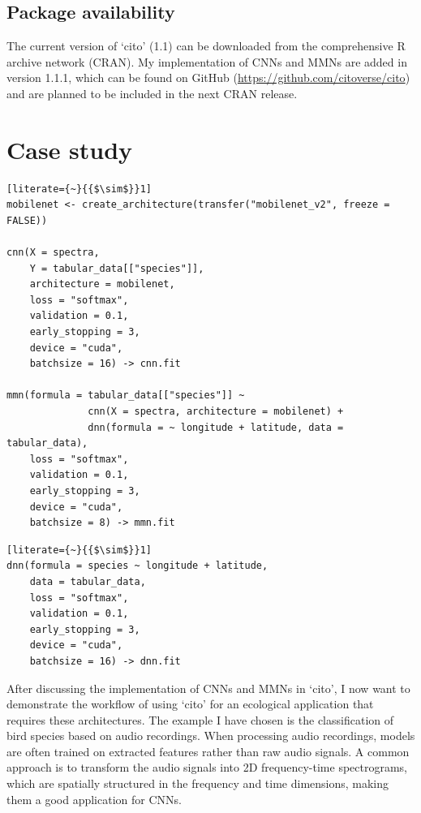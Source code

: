 \documentclass[12pt,twoside]{scrreport}
\newcommand{\pkg}[1]{`#1'}
\begin{document}
\section*{Package availability}
The current version of \pkg{cito} (1.1) can be downloaded from the comprehensive R archive network (CRAN). My implementation of CNNs and MMNs are added in version 1.1.1, which can be found on GitHub (\url{https://github.com/citoverse/cito}) and are planned to be included in the next CRAN release.

\chapter*{Case study}
\newsavebox{\cnn} %
\begin{lrbox}{\cnn}
	\begin{lstlisting}[literate={~}{{$\sim$}}1]
mobilenet <- create_architecture(transfer("mobilenet_v2", freeze = FALSE))

cnn(X = spectra,
    Y = tabular_data[["species"]],
    architecture = mobilenet,
    loss = "softmax",
    validation = 0.1,
    early_stopping = 3,
    device = "cuda",
    batchsize = 16) -> cnn.fit
		
mmn(formula = tabular_data[["species"]] ~ 
              cnn(X = spectra, architecture = mobilenet) +
              dnn(formula = ~ longitude + latitude, data = tabular_data),
    loss = "softmax",
    validation = 0.1,
    early_stopping = 3,
    device = "cuda",
    batchsize = 8) -> mmn.fit
	\end{lstlisting}
\end{lrbox}

\newsavebox{\dnn} %
\begin{lrbox}{\dnn}
	\begin{minipage}{\wd\cnn}
		\begin{lstlisting}[literate={~}{{$\sim$}}1]
dnn(formula = species ~ longitude + latitude,                             
    data = tabular_data,
    loss = "softmax",
    validation = 0.1,
    early_stopping = 3,
    device = "cuda",
    batchsize = 16) -> dnn.fit
		\end{lstlisting}
	\end{minipage}
\end{lrbox}

\noindent After discussing the implementation of CNNs and MMNs in \pkg{cito}, I now want to demonstrate the workflow of using \pkg{cito} for an ecological application that requires these architectures. The example I have chosen is the classification of bird species based on audio recordings. When processing audio recordings, models are often trained on extracted features rather than raw audio signals. A common approach is to transform the audio signals into 2D frequency-time spectrograms, which are spatially structured in the frequency and time dimensions, making them a good application for CNNs.
\end{document}
